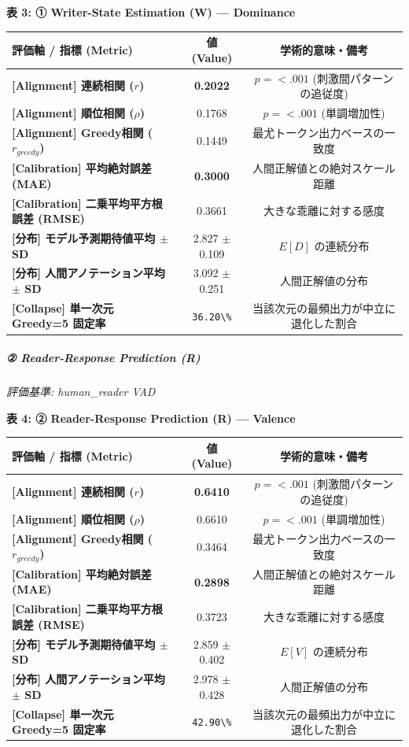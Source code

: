 \textbf{表 3: ① Writer-State Estimation (W) — Dominance}
\begin{center}
\small
\begin{tabular}{lcc}
\toprule
\textbf{評価軸 / 指標 (Metric)} & \textbf{値 (Value)} & \textbf{学術的意味・備考} \\
\midrule
\textbf{[Alignment] 連続相関 ($r$)} & \textbf{0.2022} & $p = <.001 $ (刺激間パターンの追従度) \\
\textbf{[Alignment] 順位相関 ($\rho$)} & 0.1768 & $p = <.001 $ (単調増加性) \\
\textbf{[Alignment] Greedy相関 ($r_{greedy}$)} & 0.1449 & 最尤トークン出力ベースの一致度 \\
\textbf{[Calibration] 平均絶対誤差 (MAE)} & \textbf{0.3000} & 人間正解値との絶対スケール距離 \\
\textbf{[Calibration] 二乗平均平方根誤差 (RMSE)} & 0.3661 & 大きな乖離に対する感度 \\
\textbf{[分布] モデル予測期待値平均 $\pm$ SD} & 2.827 $\pm$ 0.109 & $E[D]$ の連続分布 \\
\textbf{[分布] 人間アノテーション平均 $\pm$ SD} & 3.092 $\pm$ 0.251 & 人間正解値の分布 \\
\textbf{[Collapse] 単一次元 Greedy=5 固定率} & \texttt{36.20\textbackslash{}\%} & 当該次元の最頻出力が中立に退化した割合 \\
\bottomrule
\end{tabular}
\end{center}


\subparagraph{② Reader-Response Prediction (R)}
\textit{評価基準: human\_reader VAD}

\textbf{表 4: ② Reader-Response Prediction (R) — Valence}
\begin{center}
\small
\begin{tabular}{lcc}
\toprule
\textbf{評価軸 / 指標 (Metric)} & \textbf{値 (Value)} & \textbf{学術的意味・備考} \\
\midrule
\textbf{[Alignment] 連続相関 ($r$)} & \textbf{0.6410} & $p = <.001 $ (刺激間パターンの追従度) \\
\textbf{[Alignment] 順位相関 ($\rho$)} & 0.6610 & $p = <.001 $ (単調増加性) \\
\textbf{[Alignment] Greedy相関 ($r_{greedy}$)} & 0.3464 & 最尤トークン出力ベースの一致度 \\
\textbf{[Calibration] 平均絶対誤差 (MAE)} & \textbf{0.2898} & 人間正解値との絶対スケール距離 \\
\textbf{[Calibration] 二乗平均平方根誤差 (RMSE)} & 0.3723 & 大きな乖離に対する感度 \\
\textbf{[分布] モデル予測期待値平均 $\pm$ SD} & 2.859 $\pm$ 0.402 & $E[V]$ の連続分布 \\
\textbf{[分布] 人間アノテーション平均 $\pm$ SD} & 2.978 $\pm$ 0.428 & 人間正解値の分布 \\
\textbf{[Collapse] 単一次元 Greedy=5 固定率} & \texttt{42.90\textbackslash{}\%} & 当該次元の最頻出力が中立に退化した割合 \\
\bottomrule
\end{tabular}
\end{center}


